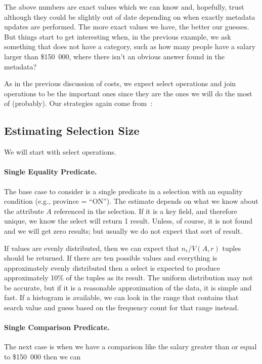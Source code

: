 The above numbers are exact values which we can know and, hopefully, trust although they could be slightly out of date depending on when exactly metadata updates are performed. The more exact values we have, the better our guesses. But things start to get interesting when, in the previous example, we ask something that does not have a category, such as how many people have a salary larger than \$150~000, where there isn't an obvious answer found in the metadata?

As in the previous discussion of costs, we expect select operations and join operations to be the important ones since they are the ones we will do the most of (probably). Our strategies again come from~\cite{dsc}: 

\subsection*{Estimating Selection Size}

We will start with select operations.


\paragraph{Single Equality Predicate.} The base case to consider is a single predicate in a selection with an equality condition (e.g., province = ``ON''). The estimate depends on what we know about the attribute $A$ referenced in the selection. If it is a key field, and therefore unique, we know the select will return 1 result. Unless, of course, it is not found and we will get zero results; but usually we do not expect that sort of result. 

If values are evenly distributed, then we can expect that $n_{r}/V(A, r)$ tuples should be returned. If there are ten possible values and everything is approximately evenly distributed then a select is expected to produce approximately 10\% of the tuples as its result. The uniform distribution may not be accurate, but if it is a reasonable approximation of the data, it is simple and fast. If a histogram is available, we can look in the range that contains that search value and guess based on the frequency count for that range instead.

\paragraph{Single Comparison Predicate.} 
The next case is when we have a comparison like the salary greater than or equal to \$150~000 then we can 

